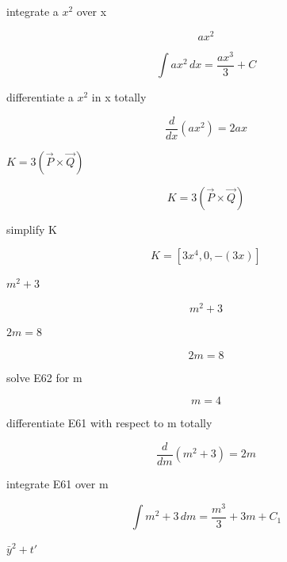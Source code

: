 \documentclass[dvipdfmx]{article}
\begin{document}
integrate a $x^2$ over x

\begin{equation}
  a x^2
  \label{eq:E56}
\end{equation}

\begin{equation}
  \int a x^2 \, dx = \frac{a x^3}{3} + C
  \label{eq:E57}
\end{equation}

differentiate a $x^2$ in x totally

\begin{equation}
  \frac{d}{dx}\left(a x^2\right) = 2 a x
  \label{eq:E58}
\end{equation}

$K = 3 (\vec{P} \times \vec{Q})$

\begin{equation}
  K = 3 (\vec{P} \times \vec{Q})
  \label{eq:E59}
\end{equation}

simplify K

\begin{equation}
  K = \left[ 3 x^4 , 0 , -\left(3 x\right) \right]
  \label{eq:E60}
\end{equation}

$m^2 + 3$

\begin{equation}
  m^2 + 3
  \label{eq:E61}
\end{equation}

$2 m = 8$

\begin{equation}
  2 m = 8
  \label{eq:E62}
\end{equation}

solve E62 for m

\begin{equation}
  m = 4
  \label{eq:E63}
\end{equation}

differentiate E61 with respect to m totally

\begin{equation}
  \frac{d}{dm}\left(m^2 + 3\right) = 2 m
  \label{eq:E64}
\end{equation}

integrate E61 over m

\begin{equation}
  \int m^2 + 3 \, dm = \frac{m^3}{3}+3 m + C_1
  \label{eq:E65}
\end{equation}

$\bar{y}^2 + t'$
\end{document}
